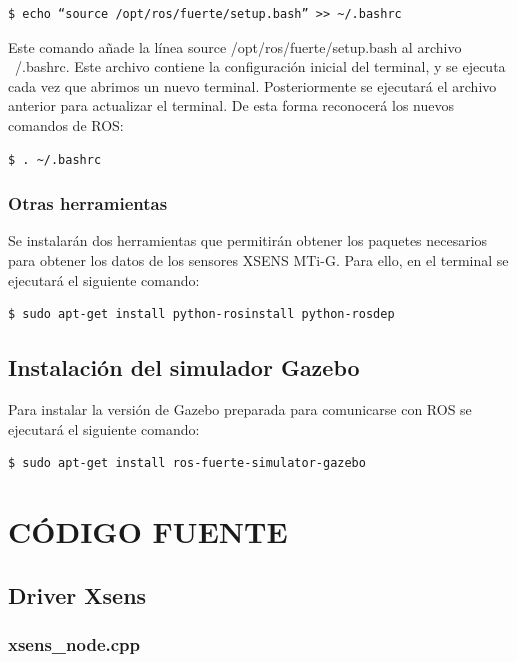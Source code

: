 \documentclass[10pt, a4paper]{report}
\begin{document}
\begin{verbatim}
$ echo “source /opt/ros/fuerte/setup.bash” >> ~/.bashrc
\end{verbatim}

Este comando añade la línea  source /opt/ros/fuerte/setup.bash al archivo ~/.bashrc. Este archivo contiene la configuración inicial del terminal, y se ejecuta cada vez que abrimos un nuevo terminal. Posteriormente se ejecutará el archivo anterior para actualizar el terminal. De esta forma reconocerá los nuevos comandos de ROS:

\begin{verbatim}
$ . ~/.bashrc
\end{verbatim}

\subsection{Otras herramientas}

Se instalarán dos herramientas que permitirán obtener los paquetes necesarios para obtener los datos de los sensores XSENS MTi-G. Para ello, en el terminal se ejecutará el siguiente comando:

\begin{verbatim}
$ sudo apt-get install python-rosinstall python-rosdep
\end{verbatim}

\section{Instalación del simulador Gazebo}

Para instalar la versión de Gazebo preparada para comunicarse con ROS se ejecutará el siguiente comando:

\begin{verbatim}
$ sudo apt-get install ros-fuerte-simulator-gazebo
\end{verbatim}


\chapter{CÓDIGO FUENTE}

\section{Driver Xsens}

\subsection{xsens\_node.cpp}
\lstset{inputencoding=utf8/latin1}

\newpage
\end{document}
